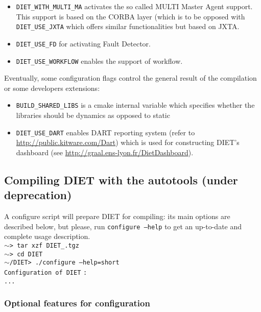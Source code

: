 \begin{itemize}
\item
  \verb+DIET_WITH_MULTI_MA+ activates the so called MULTI Master Agent
  support. This support is based on the CORBA layer (which is to be
  opposed with \verb+DIET_USE_JXTA+ which offers similar functionalities
  but based on JXTA.

\item
  \verb+DIET_USE_FD+ for activating Fault Detector.

\item
  \verb+DIET_USE_WORKFLOW+ enables the support of workflow.
\end{itemize}

\noindent
Eventually, some configuration flags control the general result of the
compilation or some developers extensions:
\begin{itemize}
\item
  \verb+BUILD_SHARED_LIBS+ is a cmake internal variable which specifies
  whether the libraries should be dynamics as opposed to static

\item
  \verb+DIET_USE_DART+ enables DART reporting system (refer to 
  \url{http://public.kitware.com/Dart}) which is used for constructing
  DIET's dashboard (see \url{http://graal.ens-lyon.fr/DietDashboard}).
\end{itemize}

\subsection{Compiling DIET with the autotools (under deprecation)}
A configure script will prepare DIET for
compiling: its main options are described below, but please, run
\texttt{configure --help} to get an up-to-date and complete usage
description.\\

\noindent
{\footnotesize
\texttt{$\sim$> tar xzf DIET\_}\dietversion\texttt{.tgz} \\
\texttt{$\sim$> cd DIET} \\
\texttt{$\sim$/DIET> ./configure --help=short} \\
\texttt{Configuration of DIET} \dietversion \texttt{:} \\
\texttt{...}
}

\subsubsection{Optional features for configuration}

